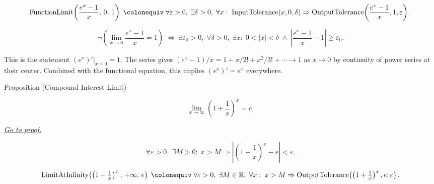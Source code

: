 \begin{remark*}
\[
  \operatorname{FunctionLimit}\!\left(\frac{e^x-1}{x},\,0,\,1\right)
  \;\colonequiv\;
  \forall\varepsilon>0,\;\exists\delta>0,\;\forall x:\;
  \operatorname{InputTolerance}(x,0,\delta)
  \Rightarrow
  \operatorname{OutputTolerance}\!\left(\frac{e^x-1}{x},1,\varepsilon\right).
\]
\end{remark*}

\begin{remark*}
\[
  \neg\left(\lim_{x\to 0}\frac{e^x-1}{x}=1\right)
  \;\iff\;
  \exists\varepsilon_0>0,\;\forall\delta>0,\;\exists x:\;
  0<|x|<\delta \;\wedge\; \left|\frac{e^x-1}{x}-1\right|\geq\varepsilon_0.
\]
\end{remark*}

\begin{remark*}[Interpretation]
This is the statement $(e^x)'\big|_{x=0} = 1$. The series gives
$(e^x - 1)/x = 1 + x/2! + x^2/3! + \cdots \to 1$ as $x \to 0$
by continuity of power series at their center. Combined with the
functional equation, this implies $(e^x)' = e^x$ everywhere.
\end{remark*}


\begin{propositionbox}{Proposition (Compound Interest Limit)}
\begin{proposition}
\label{prop:limit-compound-interest}
\[
  \lim_{x \to \infty} \left(1 + \frac{1}{x}\right)^x = e.
\]

\smallskip\noindent
\hyperref[prf:limit-compound-interest]{\textit{Go to proof.}}
\end{proposition}
\end{propositionbox}

\begin{remark*}
\[
  \forall\varepsilon>0,\;\exists M>0:\;
  x>M \Rightarrow
  \left|\!\left(1+\frac{1}{x}\right)^x - e\right| < \varepsilon.
\]
\end{remark*}

\begin{remark*}
\[
  \operatorname{LimitAtInfinity}\!\left(\left(1+\tfrac{1}{x}\right)^x,\,+\infty,\,e\right)
  \;\colonequiv\;
  \forall\varepsilon>0,\;\exists M\in\mathbb{R},\;\forall x:\;
  x>M \Rightarrow \operatorname{OutputTolerance}\!\left(\left(1+\tfrac{1}{x}\right)^x,e,\varepsilon\right).
\]
\end{remark*}


